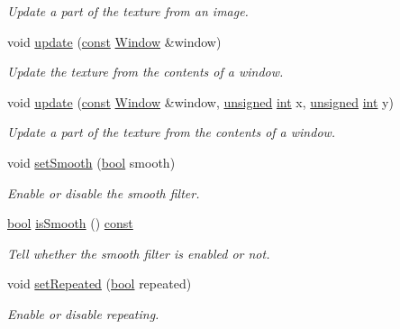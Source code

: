 \begin{DoxyCompactItemize}
\begin{DoxyCompactList}\small\item\em Update a part of the texture from an image. \end{DoxyCompactList}\item 
void \hyperlink{classsf_1_1_texture_ad3cceef238f7d5d2108a98dd38c17fc5}{update} (\hyperlink{term__entry_8h_a57bd63ce7f9a353488880e3de6692d5a}{const} \hyperlink{classsf_1_1_window}{Window} \&window)
\begin{DoxyCompactList}\small\item\em Update the texture from the contents of a window. \end{DoxyCompactList}\item 
void \hyperlink{classsf_1_1_texture_a154f246eb8059b602076009ab1cfd175}{update} (\hyperlink{term__entry_8h_a57bd63ce7f9a353488880e3de6692d5a}{const} \hyperlink{classsf_1_1_window}{Window} \&window, \hyperlink{curses_8priv_8h_aca40206900cfc164654362fa8d4ad1e6}{unsigned} \hyperlink{term__entry_8h_ad65b480f8c8270356b45a9890f6499ae}{int} x, \hyperlink{curses_8priv_8h_aca40206900cfc164654362fa8d4ad1e6}{unsigned} \hyperlink{term__entry_8h_ad65b480f8c8270356b45a9890f6499ae}{int} y)
\begin{DoxyCompactList}\small\item\em Update a part of the texture from the contents of a window. \end{DoxyCompactList}\item 
void \hyperlink{classsf_1_1_texture_a0c3bd6825b9a99714f10d44179d74324}{set\-Smooth} (\hyperlink{term__entry_8h_a002004ba5d663f149f6c38064926abac}{bool} smooth)
\begin{DoxyCompactList}\small\item\em Enable or disable the smooth filter. \end{DoxyCompactList}\item 
\hyperlink{term__entry_8h_a002004ba5d663f149f6c38064926abac}{bool} \hyperlink{classsf_1_1_texture_a1d6643d3c76f2be29dc401dc22749e16}{is\-Smooth} () \hyperlink{term__entry_8h_a57bd63ce7f9a353488880e3de6692d5a}{const} 
\begin{DoxyCompactList}\small\item\em Tell whether the smooth filter is enabled or not. \end{DoxyCompactList}\item 
void \hyperlink{classsf_1_1_texture_aaa87d1eff053b9d4d34a24c784a28658}{set\-Repeated} (\hyperlink{term__entry_8h_a002004ba5d663f149f6c38064926abac}{bool} repeated)
\begin{DoxyCompactList}\small\item\em Enable or disable repeating. \end{DoxyCompactList}\item 

\end{DoxyCompactItemize}
